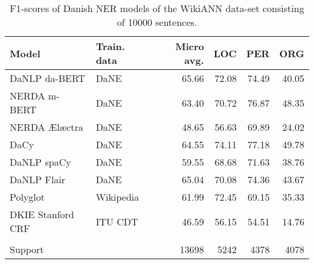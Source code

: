 \documentclass[main.tex]{subfiles}
\begin{document}
\begin{table}                                             
        \begin{center}                                    
                \begin{tabular}{l l r r r r}              
                        Model & Train. data & Micro avg. & LOC & PER & ORG \\                                       
                        \hline                            
                        DaNLP da-BERT & DaNE & 65.66 & 72.08 & 74.49 & 40.05 \\                                     
                        NERDA m-BERT & DaNE & 63.40 & 70.72 & 76.87 & 48.35 \\                                      
                        NERDA Ælæctra & DaNE & 48.65 & 56.63 & 69.89 & 24.02 \\                                     
                        DaCy & DaNE & 64.55 & 74.11 & 77.18 & 49.78 \\                                              
                        DaNLP spaCy & DaNE & 59.55 & 68.68 & 71.63 & 38.76 \\                                       
                        DaNLP Flair & DaNE & 65.04 & 70.08 & 74.36 & 43.67 \\                                       
                        Polyglot & Wikipedia & 61.99 & 72.45 & 69.15 & 35.33 \\                                     
                        DKIE Stanford CRF & ITU CDT & 46.59 & 56.15 & 54.51 & 14.76 \\                              
                         &  &  &  &  &  \\                
                        Support &  & 13698 & 5242 & 4378 & 4078 \\                                                  
                \end{tabular}                             
        \end{center}                                      
        \caption{F1\pro-scores of Danish NER models of the WikiANN data-set consisting of 10000 sentences.}         
        \label{tab:WikiANN}                               
\end{table}                                               
\end{document}
